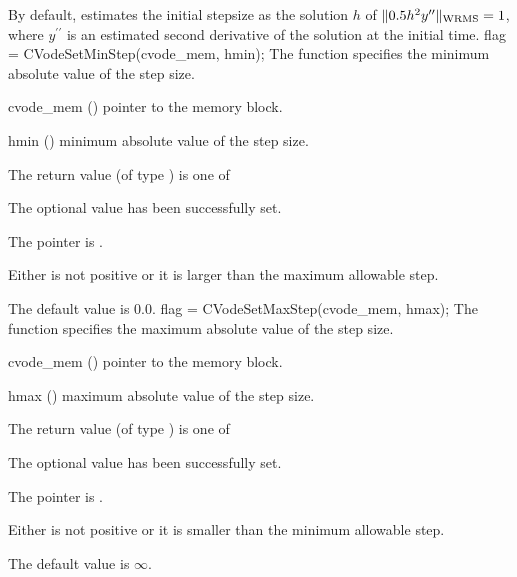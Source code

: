 {
  By default, {\cvode} estimates the initial stepsize as the solution $h$ 
  of $\| 0.5 h^2 y^{\prime\prime} \|_{\mbox{\scriptsize WRMS}} = 1$,
  where $y^{\prime\prime}$ is an estimated second derivative of the solution at the
  initial time.
}
{
flag = CVodeSetMinStep(cvode\_mem, hmin);
}
{
  The function  specifies the minimum absolute
  value of the step size.
}
{
  \begin{args}
  \item[cvode\_mem] ()
    pointer to the {\cvode} memory block.
  \item[hmin] ()
    minimum absolute value of the step size.
  \end{args}
}
{
  The return value  (of type ) is one of
  \begin{args}
  \item[\Id{CV\_SUCCESS}] 
    The optional value has been successfully set.
  \item[\Id{CV\_MEM\_NULL}]
    The  pointer is .
  \item[\Id{CV\_ILL\_INPUT}]
    Either  is not positive or it is larger than the maximum allowable step.
  \end{args}
}
{
  The default value is $0.0$.
}
{
flag = CVodeSetMaxStep(cvode\_mem, hmax);
}
{
  The function  specifies the maximum absolute
  value of the step size.
}
{
  \begin{args}
  \item[cvode\_mem] ()
    pointer to the {\cvode} memory block.
  \item[hmax] ()
    maximum absolute value of the step size.
  \end{args}
}
{
  The return value  (of type ) is one of
  \begin{args}
  \item[\Id{CV\_SUCCESS}] 
    The optional value has been successfully set.
  \item[\Id{CV\_MEM\_NULL}]
    The  pointer is .
  \item[\Id{CV\_ILL\_INPUT}]
    Either  is not positive or it is smaller than the minimum allowable step.
  \end{args}
}
{
  The default value is $\infty$.
}
